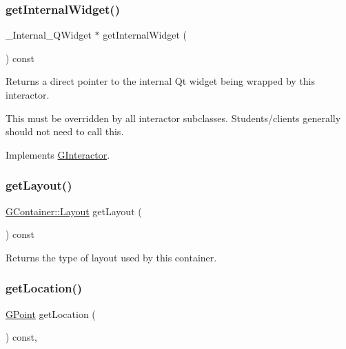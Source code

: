 \mbox{\label{classGContainer_a208ce13c1da40bf0ddb509daf99d6588}} 
\subsubsection{\texorpdfstring{get\+Internal\+Widget()}{getInternalWidget()}}
{\footnotesize\ttfamily \+\_\+\+Internal\+\_\+\+Q\+Widget $\ast$ get\+Internal\+Widget (\begin{DoxyParamCaption}{ }\end{DoxyParamCaption}) const\hspace{0.3cm}{\ttfamily [virtual]}}



Returns a direct pointer to the internal Qt widget being wrapped by this interactor. 

This must be overridden by all interactor subclasses. Students/clients generally should not need to call this. 

Implements \mbox{\hyperlink{classGInteractor}{G\+Interactor}}.

\mbox{\label{classGContainer_aeebcf77b7fdc91a1ba0371cc9b91d5e2}} 
\subsubsection{\texorpdfstring{get\+Layout()}{getLayout()}}
{\footnotesize\ttfamily \mbox{\hyperlink{classGContainer_a1b7da28ed84c0763e8f92cde2df4799b}{G\+Container\+::\+Layout}} get\+Layout (\begin{DoxyParamCaption}{ }\end{DoxyParamCaption}) const\hspace{0.3cm}{\ttfamily [virtual]}}



Returns the type of layout used by this container. 

\mbox{\label{classGInteractor_a4f83802015511edeb63b892830812c11}} 
\subsubsection{\texorpdfstring{get\+Location()}{getLocation()}}
{\footnotesize\ttfamily \mbox{\hyperlink{classGPoint}{G\+Point}} get\+Location (\begin{DoxyParamCaption}{ }\end{DoxyParamCaption}) const\hspace{0.3cm}{\ttfamily [virtual]}, {\ttfamily [inherited]}}



